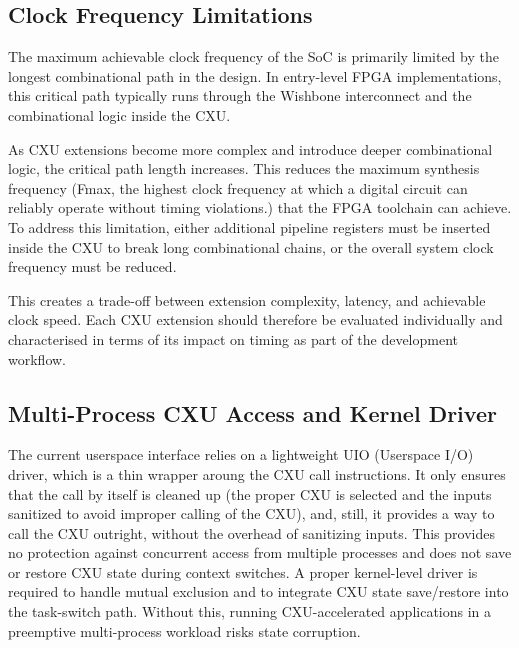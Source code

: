 \subsection{Clock Frequency Limitations}
\label{subsec:lim_clock}

The maximum achievable clock frequency of the SoC is primarily
limited by the longest combinational path in the design.
In entry-level FPGA implementations,
this critical path typically runs through the
Wishbone interconnect and the combinational logic inside the CXU.

As CXU extensions become more complex and introduce deeper combinational logic,
the critical path length increases.
This reduces the maximum synthesis frequency
(Fmax, the highest clock frequency at which a digital circuit can reliably operate without timing violations.)
that the FPGA toolchain can achieve. To address this limitation,
either additional pipeline registers must be inserted inside the CXU
to break long combinational chains, or the overall system clock frequency must be reduced.

This creates a trade-off between extension complexity,
latency, and achievable clock speed. Each CXU extension should
therefore be evaluated individually and characterised in
terms of its impact on timing as part of the development workflow.


\subsection{Multi-Process CXU Access and Kernel Driver}
\label{subsec:lim_multiprocess}

The current userspace interface relies on a lightweight UIO (Userspace I/O) driver,
which is a thin wrapper aroung the CXU call instructions.
It only ensures that the call by itself is cleaned up
(the proper CXU is selected and the inputs sanitized to avoid improper calling of the CXU),
and, still, it provides a way to call the CXU outright, without the overhead of sanitizing inputs.
This provides no protection against concurrent access from multiple processes and
does not save or restore CXU state during context switches. A proper kernel-level
driver is required to handle mutual exclusion and to integrate CXU state
save/restore into the task-switch path. Without this, running CXU-accelerated
applications in a preemptive multi-process workload risks state corruption.


